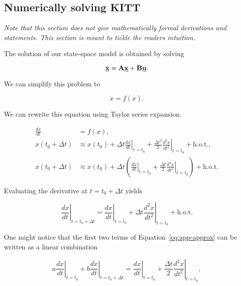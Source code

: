 \documentclass[11pt,titlepage]{report}
\begin{document}
\begin{appendices}
\chapter{Numerically solving KITT}

\textit{Note that this section does not give mathematically formal derivations and statements. This section is meant to tickle the readers intuition.}

The solution of our state-space model is obtained by solving

\begin{equation}
	\dot{\mathbf{\underline{x}}}=\mathbf{A}\mathbf{\underline{x}}+\mathbf{B}\mathbf{\underline{u}}.
\end{equation}

We can simplify this problem to 

\begin{equation}
	\dot{x}=f(x).
\end{equation}

We can rewrite this equation using Taylor series expansion.

\begin{align}
	\frac{dx}{dt} &= f(x), \\
	x(t_0+\Delta t) &\approx
		x(t_0)+
		\left. \Delta t \frac{dx}{dt} \right|_{t=t_0}+
		\frac{\Delta t^2}{2}\left. \frac{d^2x}{dt^2} \right|_{t=t_0}+
		\text{h.o.t.}, \\
	x(t_0+\Delta t) &\approx
		x(t_0)+
		\Delta t \left(
			\left. \frac{dx}{dt} \right|_{t=t_0}+
			\frac{\Delta t}{2}\left. \frac{d^2x}{dt^2} \right|_{t=t_0}
		\right) + \text{h.o.t.} \label{eq:app-approx}
\end{align}

Evaluating the derivative at $t=t_0+\Delta t$ yields

\begin{equation}
	\left. \frac{dx}{dt} \right|_{t=t_0+\Delta t} = 
		\left. \frac{dx}{dt} \right|_{t=t_0} +
		\Delta t \left. \frac{d^2x}{dt^2} \right|_{t=t_0} +
		\text{h.o.t.}
\end{equation}

One might notice that the first two terms of Equation~\ref{eq:app-approx} can be written as a linear combination

\begin{equation}
	a \left. \frac{dx}{dt} \right|_{t=t_0} +
	b \left. \frac{dx}{dt} \right|_{t=t_0+\Delta t} =
		\left. \frac{dx}{dt} \right|_{t=t_0}+
		\frac{\Delta t}{2}\left. \frac{d^2x}{dt^2} \right|_{t=t_0},
\end{equation}


\end{appendices}
\end{document}
